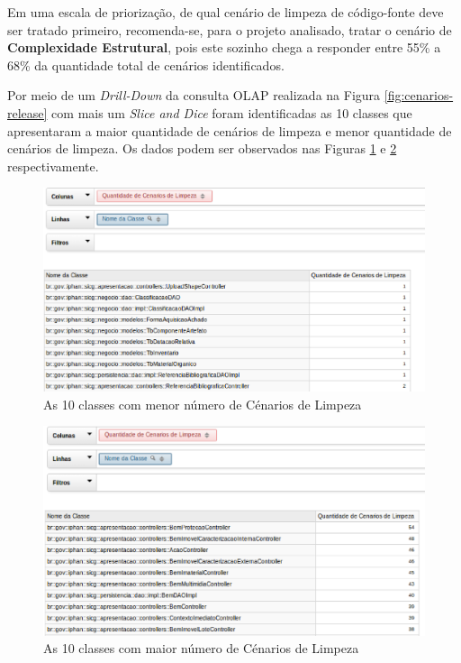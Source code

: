 Em uma escala de priorização, de qual cenário de limpeza de código-fonte deve ser tratado primeiro, recomenda-se, para o projeto analisado, tratar o cenário de \textbf{Complexidade Estrutural}, pois este sozinho chega a responder entre 55\% a 68\% da quantidade total de cenários identificados. 

Por meio de um \textit{Drill-Down} da consulta OLAP realizada na Figura \ref{fig:cenarios-release} com mais um \textit{Slice and Dice} foram identificadas as 10 classes que apresentaram a maior quantidade de cenários de limpeza e menor quantidade de cenários de limpeza. Os dados podem ser observados nas Figuras \ref{fig:best-10-cenarios} e \ref{fig:worst-10-cenarios} respectivamente.

\begin{figure}[ht!]
\centering
\includegraphics[keepaspectratio=true,scale=0.6]{figuras/10-worst.eps}
\caption{As 10 classes com menor número de Cénarios de Limpeza}
\label{fig:best-10-cenarios}
\end{figure}
\FloatBarrier

\begin{figure}[ht!]
\centering
\includegraphics[keepaspectratio=true,scale=0.6]{figuras/10-best.eps}
\caption{As 10 classes com maior número de Cénarios de Limpeza}
\label{fig:worst-10-cenarios}
\end{figure}
\FloatBarrier



